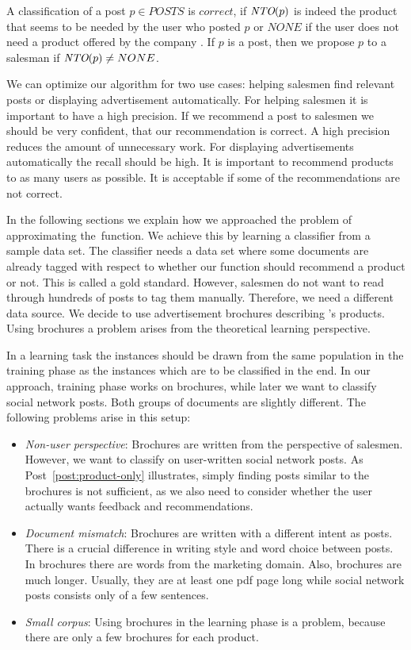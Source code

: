 A classification of a post $p \in POSTS$ is $correct$, if $\emph{NTO}(p)$ is indeed the product that seems to be needed by the user who posted $p$ or $NONE$ if the user does not need a product offered by the company \acme.
If $p$ is a post, then we propose $p$ to a salesman if $\emph{NTO}(p) \neq NONE$.

We can optimize our algorithm for two use cases: helping salesmen find relevant posts or displaying advertisement automatically.
For helping salesmen it is important to have a high precision. 
If we recommend a post to salesmen we should be very confident, that our recommendation is correct. 
A high precision reduces the amount of unnecessary work.
For displaying advertisements automatically the recall should be high. 
It is important to recommend products to as many users as possible.
It is acceptable if some of the recommendations are not correct.   

In the following sections we explain how we approached the problem of approximating the~\nto function.
We achieve this by learning a classifier from a sample data set. 
The classifier needs a data set where some documents are already tagged with respect to whether our \nto function should recommend a product or not.
This is called a gold standard.
However, salesmen do not want to read through hundreds of posts to tag them manually.
Therefore, we need a different data source.
We decide to use advertisement brochures describing \acme's products. 
Using brochures a problem arises from the theoretical learning perspective.

In a learning task the instances should be drawn from the same population in the training phase as the instances which are to be classified in the end.\nr
In our approach, training phase works on brochures, while later we want to classify social network posts. 
Both groups of documents are slightly different.
The following problems arise in this setup:

 \begin{itemize}
 	\item
		\emph{Non-user perspective}:
		Brochures are written from the perspective of salesmen.
		However, we want to classify on user-written social network posts.
		As Post~\ref{post:product-only} illustrates, simply finding posts similar to the brochures is not sufficient, as we also need to consider whether the user actually wants feedback and recommendations.
	\item
		\emph{Document mismatch}:
		Brochures are written with a different intent as posts.
		There is a crucial difference in writing style and word choice between posts.
		In brochures there are words from the marketing domain. 
		Also, brochures are much longer. 
		Usually, they are at least one pdf page long while social network posts consists only of a few sentences. 
	\item
		\emph{Small corpus}:
		Using brochures in the learning phase is a problem, because there are only a few brochures for each product.
 \end{itemize}

